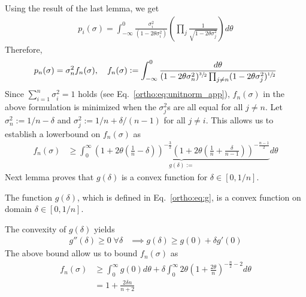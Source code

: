  Using the result of the last lemma, we get 
 \begin{align*}
     p_i(\sigma) = \int_{-\infty}^0 \frac{\sigma_i^2}{(1-2 \theta\sigma_i^2)}\left( \prod_{j} \frac{1}{\sqrt{1-2\theta \sigma_j^2}} \right) d\theta
 \end{align*}
 Therefore, 
 \begin{align} \label{ortho:eq:pnbound}
      p_n(\sigma) = \sigma_n^2 f_n(\sigma), \quad f_n(\sigma) :=  \int_{-\infty}^0 \frac{d\theta }{(1-2\theta\sigma_n^2)^{\sfrac{3}{2}}\prod_{j\neq n}(1-2\theta \sigma_j^2)^{\sfrac{1}{2}}} 
  \end{align}
 Since $\sum_{i=1}^n \sigma_i^2 = 1$ holds (see Eq.~\eqref{ortho:eq:unitnorm_app}), $f_n(\sigma)$ in the above formulation is minimized when the $\sigma_j^2$s are all equal for all $j\neq n$. Let $\sigma_n^2:=1/n-\delta$ and $\sigma_j^2:=1/n+\delta/(n-1)$ for all $j\neq i$. This allows us to establish a lowerbound on $f_n(\sigma)$ as
 \begin{align} \label{ortho:eq:g}
 f_n(\sigma) &\ge \int_0^\infty \underbrace{\left(1+2\theta\left(\frac{1}{n}-\delta\right)\right)^{-\frac{3}{2}}\left(1+2\theta\left(\frac{1}{n}+\frac{\delta}{n-1}\right)\right)^{-\frac{n-1}{2}}}_{g(\delta):=} d\theta
 \end{align}
 Next lemma proves that $g(\delta)$ is a convex function for $\delta \in [0,1/n]$. 
 \begin{lemma} \label{ortho:lemma:convexity_g}
   The function $g(\delta)$, which is defined in Eq.~\eqref{ortho:eq:g}, is a convex function on domain $\delta \in [0,1/n]$. 
 \end{lemma}
 The convexity of $g(\delta)$ yields
 \begin{align*}
 g''(\delta)\ge 0\; \forall \delta &\implies g(\delta) \ge g(0) + \delta g'(0)
 \end{align*}
 The above bound allow us to bound $f_n(\sigma)$ as 
 \begin{align*}
     f_n(\sigma)&\ge \int_0^\infty g(0)d\theta + \delta \int_0^\infty 2\theta\left(1+\frac{2\theta}{n}\right)^{-\frac{n}{2}-2} d\theta \\
  &= 1 +\frac{2  \delta n}{n+2}
 \end{align*}

